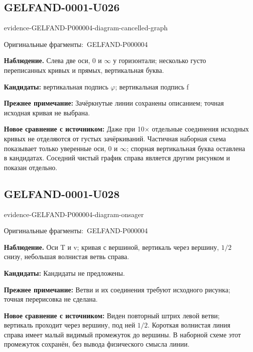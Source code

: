 \documentclass[11pt]{article}
\newcommand{\EvidenceBlock}[4]{%
 \par\smallskip\noindent\begin{minipage}{\linewidth}
 \begin{minipage}[t]{.47\linewidth}\vspace{0pt}\centering
 \csname evidence-#1-#2\endcsname\par
 {\scriptsize\SourceCropCaption\ #1}\par
 \end{minipage}\hfill
 \begin{minipage}[t]{.49\linewidth}\vspace{0pt}\raggedright
 {\small\color{orange!65!black}\textbf{#4} #3}\par
 \end{minipage}
 \end{minipage}\par\smallskip}
\newcommand{\SourceCropCaption}{Оригинальные фрагменты:}\newcommand{\ReadingCaption}{Сомнительное чтение.}\newcommand{\IncompleteCaption}{Неразобранный фрагмент.}\newcommand{\DiagramCaption}{Рисунок и набранное описание.}
\begin{document}
\subsection*{GELFAND-0001-U026}
\EvidenceBlock{GELFAND-P000004}{diagram-cancelled-graph}{Слева две оси, 0 и \(\infty\) у горизонтали; несколько густо переписанных кривых и прямых, вертикальная буква.}{Наблюдение.}
\par\smallskip\noindent\textbf{Кандидаты: } вертикальная подпись \(\varphi\); вертикальная подпись f\par
\par\smallskip\noindent\textbf{Прежнее примечание: } Зачёркнутые линии сохранены описанием; точная исходная кривая не выбрана.\par
\par\smallskip\noindent\textbf{Новое сравнение с источником: } Даже при 10× отдельные соединения исходных кривых не отделяются от густых зачёркиваний. Частичная наборная схема показывает только уверенные оси, 0 и \(\infty\); спорная вертикальная буква оставлена в кандидатах. Соседний чистый график справа является другим рисунком и показан отдельно.\par

\subsection*{GELFAND-0001-U028}
\EvidenceBlock{GELFAND-P000004}{diagram-onsager}{Оси T и v; кривая с вершиной, вертикаль через вершину, \(1/2\) снизу, небольшая волнистая ветвь справа.}{Наблюдение.}
\par\smallskip\noindent\textbf{Кандидаты: } Кандидаты не предложены.\par
\par\smallskip\noindent\textbf{Прежнее примечание: } Ветви и их соединения требуют исходного рисунка; точная перерисовка не сделана.\par
\par\smallskip\noindent\textbf{Новое сравнение с источником: } Виден повторный штрих левой ветви; вертикаль проходит через вершину, под ней \(1/2\). Короткая волнистая линия справа имеет малый видимый промежуток до вершины. В наборной схеме этот промежуток сохранён, без вывода физического смысла линии.\par
\end{document}
